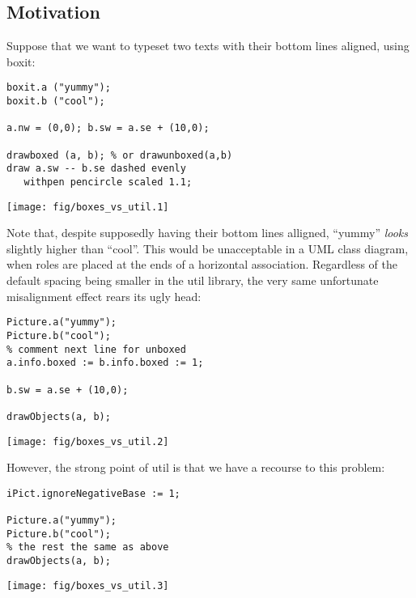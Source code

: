 \documentclass{article}
\newcommand{\code}{\ttfamily}
\begin{document}
\subsection{Motivation}

Suppose that we want to typeset two texts with their bottom lines aligned, using {\code boxit}:

\begin{multicols}{2}
\begin{verbatim}
boxit.a ("yummy");
boxit.b ("cool");

a.nw = (0,0); b.sw = a.se + (10,0);

drawboxed (a, b); % or drawunboxed(a,b)
draw a.sw -- b.se dashed evenly
   withpen pencircle scaled 1.1;
\end{verbatim}
\columnbreak
\hspace{1cm}\texttt{[image: fig/boxes\_vs\_util.1]}
\end{multicols}

Note that, despite supposedly having their bottom lines alligned,
``yummy'' {\it looks} slightly higher than ``cool''. This would be unacceptable
in a UML class diagram, when roles are placed at the ends of a horizontal association.
Regardless of the default spacing being smaller in the {\code util} library,
the very same unfortunate misalignment effect rears its ugly head:

\begin{multicols}{2}
\begin{verbatim}
Picture.a("yummy");
Picture.b("cool");
% comment next line for unboxed
a.info.boxed := b.info.boxed := 1;

b.sw = a.se + (10,0);

drawObjects(a, b);
\end{verbatim}
\columnbreak
\hspace{1cm}\texttt{[image: fig/boxes\_vs\_util.2]}
\end{multicols}

However, the strong point of {\code util} is that we have a recourse to this problem:

\begin{multicols}{2}
\begin{verbatim}
iPict.ignoreNegativeBase := 1;

Picture.a("yummy");
Picture.b("cool");
% the rest the same as above
drawObjects(a, b);
\end{verbatim}
\columnbreak
\hspace{1cm}\texttt{[image: fig/boxes\_vs\_util.3]}
\end{multicols}
\end{document}
